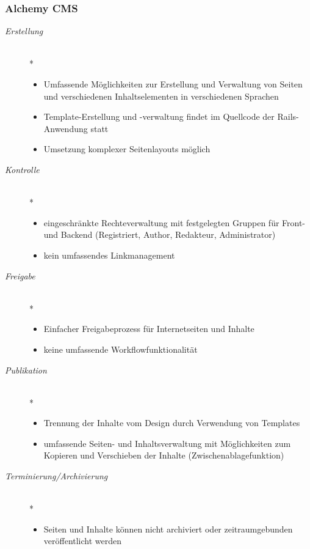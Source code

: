 \subsubsection{Alchemy CMS}

\begin{description}
\item[\emph{Erstellung}]\mbox{~}\\*
\begin{itemize}
	\item Umfassende Möglichkeiten zur Erstellung und Verwaltung von Seiten und verschiedenen Inhaltselementen in verschiedenen Sprachen
	\item Template-Erstellung und -verwaltung findet im Quellcode der Rails-Anwendung statt
	\item Umsetzung komplexer Seitenlayouts möglich
\end{itemize}
\item[\emph{Kontrolle}]\mbox{~}\\*
\begin{itemize}
	\item eingeschränkte Rechteverwaltung mit festgelegten Gruppen für Front- und Backend (Registriert, Author, Redakteur, Administrator)
	\item kein umfassendes Linkmanagement
\end{itemize}
\item[\emph{Freigabe}]\mbox{~}\\*
\begin{itemize}
	\item Einfacher Freigabeprozess für Internetseiten und Inhalte
	\item keine umfassende Workflowfunktionalität
\end{itemize}
\item[\emph{Publikation}]\mbox{~}\\*
\begin{itemize}
	\item Trennung der Inhalte vom Design durch Verwendung von Templates
	\item umfassende Seiten- und Inhaltsverwaltung mit Möglichkeiten zum Kopieren und Verschieben der Inhalte (Zwischenablagefunktion)
\end{itemize}
\item[\emph{Terminierung/Archivierung}]\mbox{~}\\*
\begin{itemize}
	\item Seiten und Inhalte können nicht archiviert oder zeitraumgebunden veröffentlicht werden
\end{itemize}
\end{description}

